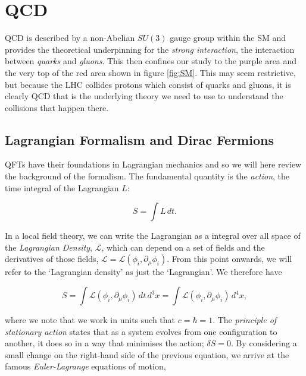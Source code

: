 \section{QCD}

QCD is described by a non-Abelian $SU(3)$ gauge group within the SM and provides the theoretical underpinning for the \emph{strong interaction}, the interaction between \emph{quarks} and \emph{gluons}. This then confines our study to the purple area and the very top of the red area shown in figure \ref{fig:SM}. This may seem restrictive, but because the LHC collides protons which consist of quarks and gluons, it is clearly QCD that is the underlying theory we need to use to understand the collisions that happen there. 

\subsection{Lagrangian Formalism and Dirac Fermions}
QFTs have their foundations in Lagrangian mechanics and so we will here review the background of the formalism. The fundamental quantity is the \emph{action}, the time integral of the Lagrangian $L$:

\begin{equation}
S = \int L \hspace{2pt} dt.
\end{equation}

In a local field theory, we can write the Lagrangian as a integral over all space of the \emph{Lagrangian Density}, $\mathscr{L}$, which can depend on a set of fields and the derivatives of those fields, $\mathscr{L} = \mathscr{L}(\phi_i, \partial_\mu \phi_i)$. From this point onwards, we will refer to the `Lagrangian density' as just the `Lagrangian'. We therefore have

\begin{equation}
S = \int \mathscr{L} (\phi_i, \partial_\mu \phi_i) \hspace{2pt} dt \hspace{2pt} d^3 x = \int \mathscr{L} (\phi_i, \partial_\mu \phi_i) \hspace{2pt} d^4 x,
\end{equation}

where we note that we work in units such that $c = \hbar = 1$. The \emph{principle of stationary action} states that as a system evolves from one configuration to another, it does so in a way that minimises the action; $\delta S = 0$. By considering a small change on the right-hand side of the previous equation, we arrive at the famous \emph{Euler-Lagrange} equations of motion,

